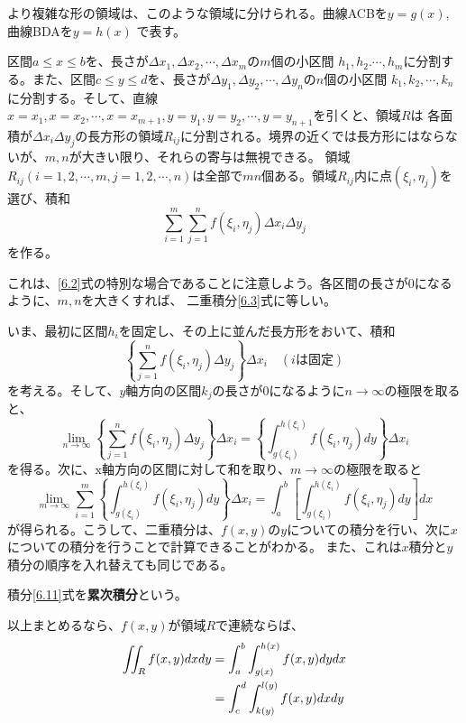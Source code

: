\documentclass[a4j,dvipdfmx]{jsarticle}
\begin{document}
より複雑な形の領域は、このような領域に分けられる。曲線ACBを$y=g(x)$,曲線BDAを$y=h(x)$
で表す。

区間$a\leq x\leq b$を、長さが$\Delta x_1,\Delta x_2,\cdots,\Delta x_m$の$m$個の小区間
$h_1,h_2.\cdots,h_m$に分割する。また、区間$c\leq y\leq d$を、長さが$\Delta y_1,\Delta y_2,\cdots,\Delta y_n$の$n$個の小区間
$k_1,k_2,\cdots,k_n$に分割する。そして、直線$x=x_1,x=x_2,\cdots,x=x_{m+1},y=y_1,y=y_2,\cdots,y=y_{n+1}$を引くと、領域$R$は
各面積が$\Delta x_i\Delta y_j$の長方形の領域$R_{ij}$に分割される。境界の近くでは長方形にはならないが、$m,n$が大きい限り、それらの寄与は無視できる。
領域$R_{ij}(i=1,2,\cdots,m,j=1,2,\cdots,n)$は全部で$mn$個ある。領域$R_{ij}$内に点$(\xi_i,\eta_j)$を選び、積和
\begin{equation}
    \sum_{i=1}^{m}\sum_{j=1}^{n}f(\xi_i,\eta_j)\Delta x_i\Delta y_j\label{6.8}
\end{equation}
を作る。

これは、\eqref{6.2}式の特別な場合であることに注意しよう。各区間の長さが0になるように、$m,n$を大きくすれば、
二重積分\eqref{6.3}式に等しい。

いま、最初に区間$h_i$を固定し、その上に並んだ長方形をおいて、積和
\begin{equation}
    \left\{\sum_{j=1}^{n}f(\xi_i,\eta_j)\Delta y_j\right\}\Delta x_i\quad(i\text{は固定})\label{6.9}
\end{equation}
を考える。そして、$y$軸方向の区間$k_j$の長さが0になるように$n\to\infty$の極限を取ると、
\begin{equation}
    \lim_{n\to\infty} \left\{\sum_{j=1}^{n}f(\xi_i,\eta_j)\Delta y_j\right\}\Delta x_i=\left\{\int_{g(\xi_i)}^{h(\xi_i)}f(\xi_i,\eta_j)dy\right\}\Delta x_i\label{6.10}
\end{equation}
を得る。次に、x軸方向の区間に対して和を取り、$m\to\infty$の極限を取ると
\begin{equation}
    \lim_{m\to\infty}\sum_{i=1}^{m}\left\{\int_{g(\xi_i)}^{h(\xi_i)}f(\xi_i,\eta_j)dy\right\}\Delta x_i=\int_a^b\left[\int_{g(\xi_i)}^{h(\xi_i)}f(\xi_i,\eta_j)dy\right]dx\label{6.11}
\end{equation}
が得られる。こうして、二重積分は、$f(x,y)$の$y$についての積分を行い、次に$x$についての積分を行うことで計算できることがわかる。
また、これは$x$積分と$y$積分の順序を入れ替えても同じである。

積分\eqref{6.11}式を\textbf{累次積分}という。

以上まとめるなら、$f(x,y)$が領域$R$で連続ならば、
\begin{align}
    \iint_R f(x,y)dxdy&=\int_a^b\int_{g(x)}^{h(x)}f(x,y)dydx\notag\\
    &=\int_c^d\int_{k(y)}^{l(y)}f(x,y)dxdy\label{6.13}
\end{align}
\end{document}
